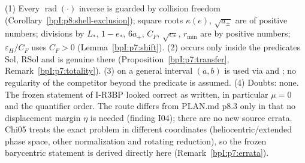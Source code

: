 \begin{remark}\label{bpI:p8:totality}
(1) Every $\operatorname{rad}(\cdot)$ inverse is guarded by collision freedom (Corollary~\ref{bpI:p8:shell-exclusion}); square roots $\kappa(e)$, $\sqrt{a_\pm}$ are of positive numbers; divisions by $L_*$, $1-e_*$, $6a_+$, $C_F$, $\sqrt{c_*}$, $r_{\min}$ are by positive numbers; $\varepsilon_H/C_F$ uses $C_F>0$ (Lemma~\ref{bpI:p7:shift}).
(2)  occurs only inside the predicates $\mathrm{Sol}$, $\mathrm{RSol}$ and is genuine there (Proposition~\ref{bpI:p7:transfer}, Remark~\ref{bpI:p7:totality}).
(3)  on a general interval $(a,b)$ is used via  and ; no regularity of the competitor beyond the predicate is assumed.
(4) Doubts: none. The frozen statement of I-R3BP looked correct as written, in particular $\mu=0$ and the quantifier order. The route differs from PLAN.md p8.3 only in that no displacement margin $\eta$ is needed (finding I04); there are no new source errata. Chi05 treats the exact problem in different coordinates (heliocentric/extended phase space, other normalization and rotating reduction), so the frozen barycentric statement is derived directly here (Remark~\ref{bpI:p7:errata}).
\end{remark}
